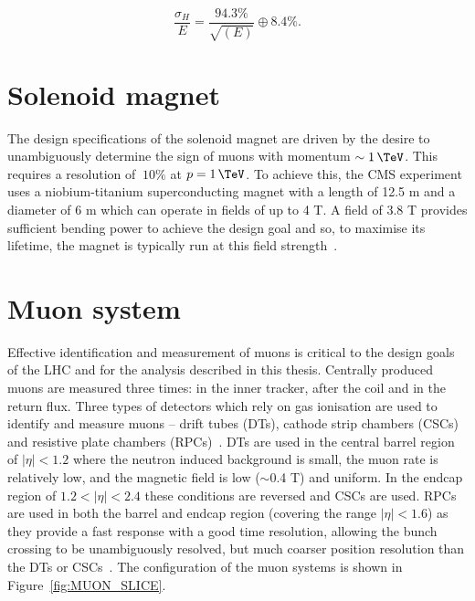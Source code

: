 \begin{equation}
\frac{\sigma_H}{E} = \frac{94.3\%}{\sqrt{(E)}} \oplus 8.4\%.
\label{equ:energy-resolution-hcal}
\end{equation}

\section{Solenoid magnet}

The design specifications of the solenoid magnet are driven by the desire to unambiguously determine
the sign of muons with momentum $\sim 1\,\TeV$. This requires a resolution of $~10\%$ at $p=1\,\TeV$.
To achieve this, the CMS experiment uses a niobium-titanium superconducting magnet with a length of
12.5 m and a diameter of 6 m which can operate in fields of up to 4 T. A field of 3.8 T provides
sufficient bending power to achieve the design goal and so, to maximise its lifetime, the magnet is
typically run at this field strength~\cite{CMS}.

\section{Muon system}

Effective identification and measurement of muons is critical to the design goals of the LHC and
for the analysis described in this thesis. Centrally produced muons are measured three times:
in the inner tracker, after the coil and in the return flux. Three types of detectors which rely on gas ionisation are 
used to identify and measure muons -- drift tubes (DTs), cathode strip chambers (CSCs) and resistive
plate chambers (RPCs)~\cite{CMS}. DTs are used in the central barrel region of $|\eta| < 1.2$ where 
the neutron induced background is small, the muon rate is relatively low, 
and the magnetic field is low ($\sim$0.4 T) and uniform. In the endcap region of $ 1.2 < |\eta| < 2.4$ these conditions are 
reversed and CSCs are used. RPCs are used in both the barrel and endcap region (covering the range $|\eta| < 1.6$) as they provide a fast response with a good time 
resolution, allowing the bunch crossing to be unambiguously resolved, but much coarser position resolution than the DTs or CSCs~\cite{muon_tdr}. 
The configuration of the muon systems is shown in Figure~\ref{fig:MUON_SLICE}.

